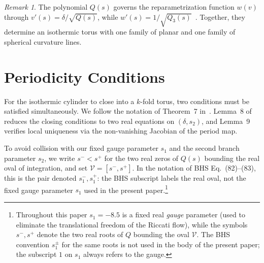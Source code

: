 \documentclass[11pt,a4paper]{article}
\theoremstyle{plain}
\theoremstyle{definition}
\theoremstyle{remark}
\newtheorem{remark}[theorem]{Remark}
\begin{document}
\begin{remark}
  The polynomial $Q(s)$ governs the reparametrization function
  $w(v)$ through $v'(s) = \delta/\sqrt{Q(s)}$, while
  $w'(s) = 1/\sqrt{Q_3(s)}$~\cite[Corollary~6]{BHS-comp}.
  Together, they determine an isothermic torus with one family of
  planar and one family of spherical curvature lines.
\end{remark}


\section{Periodicity Conditions}\label{sec:periodicity}

For the isothermic cylinder to close into a $k$-fold torus, two
conditions must be satisfied simultaneously.  We follow the notation of
Theorem~7 in~\cite{BHS25}.  Lemma~8 of~\cite{BHS25} reduces the
closing conditions to two real equations on $(\delta, s_2)$, and
Lemma~9 verifies local uniqueness via the non-vanishing Jacobian of the
period map.

To avoid collision with our fixed gauge parameter $s_1$ and the second
branch parameter $s_2$, we write $s^- < s^+$ for the two real zeros of
$Q(s)$ bounding the real oval of integration, and set
$\mathcal V = [s^-, s^+]$.  In the notation of BHS Eq.~(82)--(83),
this is the pair denoted $s_1^-, s_1^+$: the BHS subscript labels the
real oval, not the fixed gauge parameter $s_1$ used in the present
paper.\footnote{Throughout this paper $s_1 = -8.5$ is a fixed real
  \emph{gauge} parameter (used to eliminate the translational freedom
  of the Riccati flow), while the symbols $s^-, s^+$ denote the two
  real roots of $Q$ bounding the oval $\mathcal V$.  The BHS convention
  $s_1^\pm$ for the same roots is not used in the body of the present
  paper; the subscript $1$ on $s_1$ always refers to the gauge.}
\end{document}
